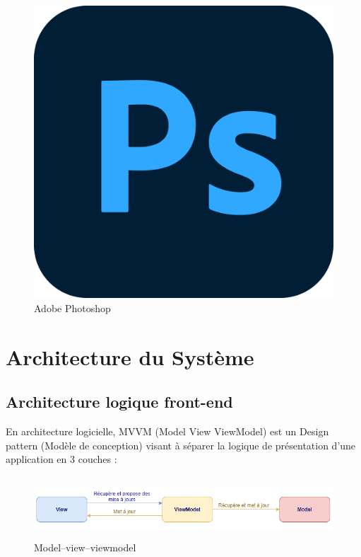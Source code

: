 \begin{itemize}
          \begin{figure}[H]
              \centering\includegraphics[scale=0.16]{chap1.images/adobe-photoshop-logo.png}
              \caption{Adobe Photoshop}

          \end{figure}

\end{itemize}



\newpage
\section{Architecture du Système}
\subsection{Architecture logique front-end}

En architecture logicielle, MVVM (Model View ViewModel) est un Design pattern (Modèle de conception) visant à séparer la logique de présentation d’une application en 3 couches :\\

\begin{figure}[ht]
    \centering
    \includegraphics[width=1\textwidth,height=2.3cm]{chap1.images/mvvm.png}
    \caption{Model–view–viewmodel}
\end{figure}


